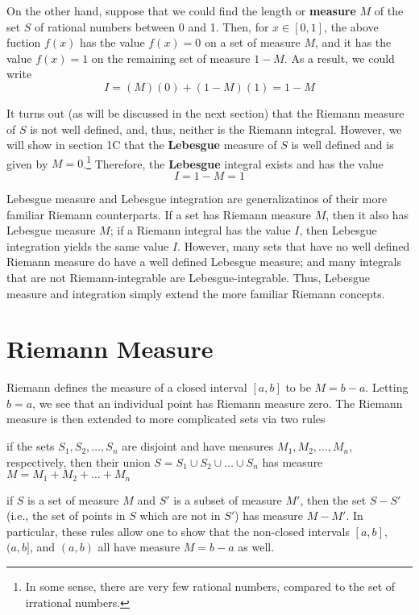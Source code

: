 On the other hand, suppose that we could find the length or
\textbf{measure} $M$ of the set $S$ of rational numbers between 0 and 1.
Then, for $x \in [0, 1]$, the above fuction $f(x)$ has the value
$f(x) = 0$ on a set of measure $M$, and it has the value $f(x) = 1$ on
the remaining set of measure $1 - M$.  As a result, we could write
%
\begin{equation*}
  I = (M)(0) + (1-M)(1) = 1 - M
\end{equation*}
%

It turns out (as will be discussed in the next section) that the
Riemann measure of $S$ is not well defined, and, thus, neither is the
Riemann integral.  However, we will show in section 1C that the
\textbf{Lebesgue} measure of $S$ is well defined and is given by
$M = 0$.\footnote{
  In some sense, there are very few rational numbers, compared to the
  set of irrational numbers.}
Therefore, the \textbf{Lebesgue} integral exists and has the value
%
\begin{equation*}
  I = 1 - M = 1
\end{equation*}
%

Lebesgue measure and Lebesgue integration are generalizatinos of their
more familiar Riemann counterparts.  If a set has Riemann measure $M$,
then it also has Lebesgue measure $M$; if a Riemann integral has the
value $I$, then Lebesgue integration yields the same value $I$.
However, many sets that have no well defined Riemann measure do have a
well defined Lebesgue measure; and many integrals that are not
Riemann-integrable are Lebesgue-integrable.  Thus, Lebesgue measure
and integration simply extend the more familiar Riemann concepts.
%
\section{Riemann Measure}
%
Riemann defines the measure of a closed interval $[a, b]$ to be
$M = b - a$.  Letting $b = a$, we see that an individual point has Riemann
measure zero.  The Riemann measure is then extended to more
complicated sets via two rules
\begin{enumerate*}
\item
  if the sets $S_1, S_2, \dots, S_n$ are disjoint and have
  measures $M_1, M_2, \dots, M_n$, respectively, then their union
  $S = S_1 \cup S_2 \cup \dots \cup S_n$ has measure
  $M = M_1 + M_2 + \dots + M_n$
\item
  if $S$ is a set of measure $M$ and $S'$ is a subset of measure
  $M'$, then the set $S - S'$ (i.e., the set of points in $S$
  which are not in $S'$) has measure $M - M'$.  In particular, these
  rules allow one to show that the non-closed intervals
  $[a, b]$, $(a, b]$, and $(a, b)$ all have measure $M = b - a$ as well.
\end{enumerate*}

